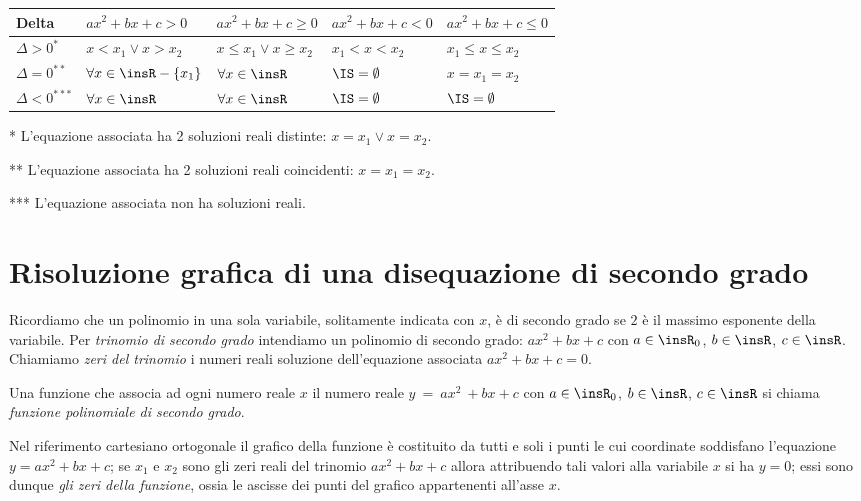 \begin{center}
\begin{threeparttable}
\begin{tabular}{lllll}
\toprule
Delta & $ax^2+bx+c>0$& $ax^2+bx+c\ge0$& $ax^2+bx+c<0$ & $ax^2+bx+c\le0$\\
\midrule
 $\Delta >0^{*}$& $ x<x_1\vee x>x_2 $ & $ x\le x_1\vee x\ge x_2 $& $ x_1<x<x_2 $&$ x_1\le x\le x_2 $\\
$\Delta =0^{**}$& $\forall x\in \insR-\{x_1\} $ & $ \forall x\in \insR $& $ \IS=\emptyset $&$ x=x_1=x_2 $\\
$\Delta <0^{***}$&$ \forall x\in \insR $ & $ \forall x\in \insR $& $ \IS=\emptyset $&$ \IS=\emptyset $\\
\bottomrule
\end{tabular}
\begin{tablenotes}
\item [*] L'equazione associata ha 2 soluzioni reali distinte: $x=x_1\vee x=x_2$.
\item [**] L'equazione associata ha 2 soluzioni reali coincidenti: $x=x_1=x_2$.
\item [***] L'equazione associata non ha soluzioni reali.
\end{tablenotes}
\end{threeparttable}
\end{center}
\vspazio\ovalbox{\risolvii \ref{ese:4.1}, \ref{ese:4.2}, \ref{ese:4.3}, \ref{ese:4.4}, \ref{ese:4.5}, \ref{ese:4.6}}
\section{Risoluzione grafica di una disequazione di secondo grado}
Ricordiamo che un polinomio in una sola variabile, solitamente indicata con $x$, è di secondo grado se $2$ è il massimo esponente della variabile. Per \emph{trinomio di secondo grado} intendiamo un polinomio di secondo grado: $ax^2+bx+c$ con $a\in \insR_{0}$, $b\in \insR$, $c\in \insR$. Chiamiamo \emph{zeri del trinomio} i numeri reali soluzione dell'equazione associata $ax^2+bx+c=0$.

\begin{definizione}
Una funzione che associa ad ogni numero reale $x$ il numero reale $y~=~ax^2~+bx+c$ con $a\in \insR_{0}$, $b\in \insR$, $c\in \insR$ si chiama \emph{funzione polinomiale di secondo grado}.
\end{definizione}

Nel riferimento cartesiano ortogonale il grafico della funzione è costituito da tutti e soli i punti le cui coordinate soddisfano l’equazione $y=ax^2+bx+c$; se $x_1$ e $x_2$ sono gli zeri reali del trinomio $ax^2+bx+c$ allora attribuendo tali valori alla variabile $x$ si ha $y=0$; essi sono dunque \emph{gli zeri della funzione}, ossia le ascisse dei punti del grafico appartenenti all’asse $x$.

